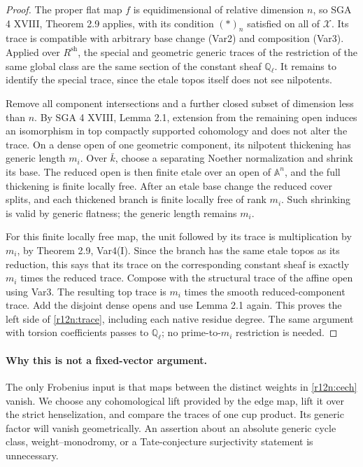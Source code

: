 \begin{proof}
The proper flat map $f$ is equidimensional of relative dimension
$n$, so SGA 4 XVIII, Theorem 2.9 applies, with its condition
$(*)_n$ satisfied on all of $\mathcal X$.  Its trace is compatible
with arbitrary base change (Var2) and composition (Var3).  Applied
over $R^{\mathrm{sh}}$, the special and geometric generic traces
of the restriction of the same global class are the same section of
the constant sheaf $\mathbb Q_\ell$.  It remains to identify the
special trace, since the etale topos itself does not see nilpotents.

Remove all component intersections and a further closed subset of
dimension less than $n$.  By SGA 4 XVIII, Lemma 2.1, extension from
the remaining open induces an isomorphism in top compactly supported
cohomology and does not alter the trace.  On a dense open of one
geometric component, its nilpotent thickening has generic length
$m_i$.  Over $\bar k$, choose a separating Noether normalization
and shrink its base.  The reduced open is then finite etale over
an open of $\mathbb A^n$, and the full thickening is finite locally
free.  After an etale base change the reduced cover splits, and each
thickened branch is finite locally free of rank $m_i$.  Such shrinking
is valid by generic flatness; the generic length remains $m_i$.

For this finite locally free map, the unit followed by its trace is
multiplication by $m_i$, by Theorem 2.9, Var4(I).  Since the branch
has the same etale topos as its reduction, this says that its trace
on the corresponding constant sheaf is exactly $m_i$ times the
reduced trace.  Compose with the structural trace of the affine open
using Var3.  The resulting top trace is $m_i$ times the smooth
reduced-component trace.  Add the disjoint dense opens and use
Lemma 2.1 again.  This proves the left side of
\eqref{r12n:trace}, including each native residue degree.
The same argument with torsion coefficients passes to
$\mathbb Q_\ell$; no prime-to-$m_i$ restriction is needed.
\end{proof}

\paragraph{Why this is not a fixed-vector argument.}
The only Frobenius input is that maps between the distinct weights
in \eqref{r12n:cech} vanish.  We choose any cohomological lift
provided by the edge map, lift it over the strict henselization, and
compare the traces of one cup product.  Its generic factor will
vanish geometrically.  An assertion about an absolute generic
cycle class, weight--monodromy, or a Tate-conjecture surjectivity
statement is unnecessary.

